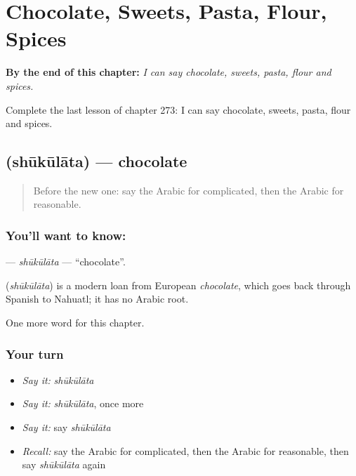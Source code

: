 
\chapter{Chocolate, Sweets, Pasta, Flour, Spices}
\label{ch:ar-chocolate-sweets-pasta-flour-spices}

\begin{chapteropening}
\textbf{By the end of this chapter:} \emph{I can say chocolate, sweets, pasta, flour and spices.}

Complete the last lesson of chapter 273: I can say chocolate, sweets, pasta, flour and spices.
\end{chapteropening}

\section[\texorpdfstring{\ar{شوكولاتة} (shūkūlāta)}{شوكولاتة (shūkūlāta)}]{ (shūkūlāta) — chocolate}

\label{lesson:AR-C273-shukulata}



\begin{quote}
Before the new one: say the Arabic for complicated, then the Arabic for reasonable.
\end{quote}

\subsection*{You'll want to know: }
\textbf{} — \emph{shūkūlāta} — \textquotedblleft{}chocolate\textquotedblright{}.

\begin{cousinweb}
\textbf{} (\emph{shūkūlāta}) is a modern loan from European \emph{chocolate}, which goes back through Spanish to Nahuatl; it has no Arabic root.
\end{cousinweb}

\begin{grammarlens}[title={What you've built}]
One more word for this chapter.
\end{grammarlens}

\subsection*{Your turn}
\begin{itemize}
\raggedright
  \item \emph{Say it:} \emph{shūkūlāta}
  \item \emph{Say it:} \emph{shūkūlāta}, once more
  \item \emph{Say it:} say \emph{shūkūlāta}
  \item \emph{Recall:} say the Arabic for complicated, then the Arabic for reasonable, then say \emph{shūkūlāta} again
\end{itemize}

